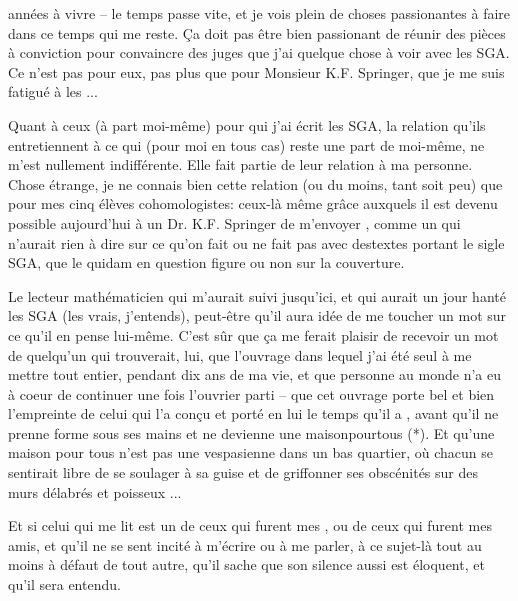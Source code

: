 années à vivre -- le temps passe vite, et je vois plein de choses passionantes à faire dans ce temps qui me reste. Ça  doit pas être bien passionant de réunir des pièces à conviction pour convaincre des juges que j'ai quelque chose à voir avec les SGA. Ce n'est pas pour eux, pas plus que pour Monsieur K.F. Springer, que je me suis fatigué à les  ...

Quant à ceux (à part moi-même) pour qui j'ai écrit les SGA, la relation qu'ils entretiennent à ce qui (pour moi en tous cas) reste une part de moi-même, ne m'est nullement indifférente. Elle fait partie de leur relation à ma personne. Chose étrange, je ne connais bien cette relation (ou du moins, tant soit peu) que pour mes cinq élèves cohomologistes: ceux-là même grâce auxquels il est devenu possible aujourd'hui  à un Dr. K.F. Springer de m'envoyer , comme un  qui n'aurait rien à dire sur ce qu'on fait ou ne fait pas avec des\inserted{ }textes portant le sigle SGA, que le quidam en question figure ou non sur la couverture.

Le lecteur mathématicien qui m'aurait suivi jusqu'ici, et qui aurait un jour hanté les SGA (les vrais, j'entends)\deleted{\unsure{*}}, peut-être qu'il aura idée de me toucher un mot sur ce qu'il en pense lui-même. C'est sûr que ça me ferait plaisir de recevoir un mot de quelqu'un qui trouverait, lui, que l'ouvrage dans lequel j'ai été seul à me mettre tout entier, pendant dix ans de ma vie, et que p\enspace e\enspace r\enspace s\enspace o\enspace n\enspace n\enspace e au monde n'a eu à coeur de continuer une fois l'ouvrier parti -- que cet ouvrage porte bel et bien l'empreinte de celui qui l'a conçu et porté en lui le temps qu'il a , avant qu'il ne prenne forme sous ses mains et ne devienne une m\enspace a\enspace i\enspace s\enspace o\enspace n\quad p\enspace o\enspace u\enspace r\quad t\enspace o\enspace u\enspace s (*). Et qu'une maison pour tous n'est pas une vespasienne dans un bas quartier, où chacun se sentirait libre de se soulager à sa guise et de griffonner ses obscénités sur des murs délabrés et poisseux ...

Et si celui qui me lit est un de ceux qui furent mes , ou  de ceux qui furent mes amis, et qu'il ne se sent incité à m'écrire ou à me parler, à ce sujet-là tout au moins à défaut de tout autre, qu'il sache que son silence aussi est éloquent, et qu'il sera entendu.
